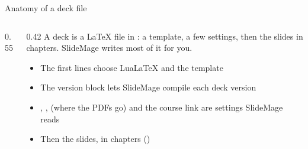 
\begin{standardframe}{Anatomy of a deck file}
	\begin{columns}[T,onlytextwidth]
		\begin{column}{0.55\linewidth}
		\end{column}
		\begin{column}{0.42\linewidth}
			\small
			A deck is a LaTeX file in : a template, a few settings,
			then the slides in chapters. SlideMage writes most of it for you.
			\par\medskip
			\begin{itemize}
				\item The first lines choose LuaLaTeX and the template
				\item The version block lets SlideMage compile each deck version
				\item {}, ,  (where the PDFs go) and the course link are settings SlideMage reads
				\item Then the slides, in chapters ()
			\end{itemize}
		\end{column}
	\end{columns}
\end{standardframe}
